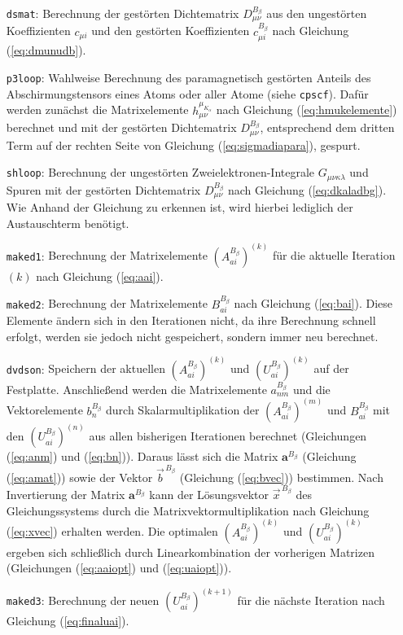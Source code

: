 \begin{itemize}[leftmargin=60pt]
\item[\texttt{dsmat}:] Berechnung der gestörten Dichtematrix $D_{\mu\nu}^{B_\beta}$ aus den ungestörten Koeffizienten $c_{\mu i}$ und den gestörten Koeffizienten $c_{\mu i}^{B_\beta}$ nach Gleichung (\ref{eq:dmunudb}).
\item[\texttt{p3loop}:] Wahlweise Berechnung des paramagnetisch gestörten Anteils des Abschirmungstensors eines Atoms oder aller Atome (siehe \texttt{cpscf}). Dafür werden zunächst die Matrixelemente $h_{\mu\nu}^{\mu_{K_\alpha}}$ nach Gleichung (\ref{eq:hmukelemente}) berechnet und mit der gestörten Dichtematrix $D_{\mu\nu}^{B_\beta}$, entsprechend dem dritten Term auf der rechten Seite von Gleichung (\ref{eq:sigmadiapara}), gespurt.
\item[\texttt{shloop}:] Berechnung der ungestörten Zweielektronen-Integrale $G_{\mu\nu\kappa\lambda}$ und Spuren mit der gestörten Dichtematrix $D_{\mu\nu}^{B_\beta}$ nach Gleichung (\ref{eq:dkaladbg}). Wie Anhand der Gleichung zu erkennen ist, wird hierbei lediglich der Austauschterm benötigt.
\item[\texttt{maked1}:] Berechnung der Matrixelemente $\left(A_{ai}^{B_\beta}\right)^{(k)}$ für die aktuelle Iteration $(k)$ nach Gleichung (\ref{eq:aai}).
\item[\texttt{maked2}:] Berechnung der Matrixelemente $B_{ai}^{B_\beta}$ nach Gleichung (\ref{eq:bai}). Diese Elemente ändern sich in den Iterationen nicht, da ihre Berechnung schnell erfolgt, werden sie jedoch nicht gespeichert, sondern immer neu berechnet. 
\item[\texttt{dvdson}:] Speichern der aktuellen $\left(A_{ai}^{B_\beta}\right)^{(k)}$ und $\left(U_{ai}^{B_\beta}\right)^{(k)}$ auf der Festplatte. Anschließend werden die Matrixelemente $a_{nm}^{B_\beta}$ und die Vektorelemente $b_{n}^{B_\beta}$ durch Skalarmultiplikation der $\left(A_{ai}^{B_\beta}\right)^{(m)}$ und $B_{ai}^{B_\beta}$ mit den $\left(U_{ai}^{B_\beta}\right)^{(n)}$ aus allen bisherigen Iterationen berechnet (Gleichungen (\ref{eq:anm}) und (\ref{eq:bn})). Daraus lässt sich die Matrix $\boldsymbol{a}^{B_\beta}$ (Gleichung (\ref{eq:amat})) sowie der Vektor $\vec{b}^{\,B_\beta}$ (Gleichung (\ref{eq:bvec})) bestimmen. Nach Invertierung der Matrix $\boldsymbol{a}^{B_\beta}$ kann der Lösungsvektor $\vec{x}^{\,B_\beta}$ des Gleichungssystems durch die Matrixvektormultiplikation nach Gleichung (\ref{eq:xvec}) erhalten werden. Die optimalen $\left(A_{ai}^{B_\beta}\right)^{(k)}$ und $\left(U_{ai}^{B_\beta}\right)^{(k)}$ ergeben sich schließlich durch Linearkombination der vorherigen Matrizen (Gleichungen (\ref{eq:aaiopt}) und (\ref{eq:uaiopt})).
\item[\texttt{maked3}:] Berechnung der neuen $\left(U_{ai}^{B_\beta}\right)^{(k+1)}$ für die nächste Iteration nach Gleichung (\ref{eq:finaluai}).
\end{itemize}


